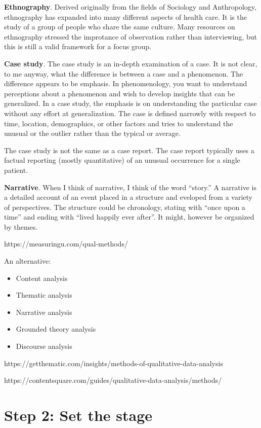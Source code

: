 \documentclass[
  letterpaper,
  DIV=11,
  numbers=noendperiod]{scrreprt}
\providecommand{\tightlist}{%
  \setlength{\itemsep}{0pt}\setlength{\parskip}{0pt}}
\begin{document}
\begin{tcolorbox}
\textbf{Ethnography}. Derived originally from the fields of Sociology
and Anthropology, ethnography has expanded into many different aspects
of health care. It is the study of a group of people who share the same
culture. Many resources on ethnography stressed the improtance of
observation rather than interviewing, but this is still a valid
framework for a focus group.

\textbf{Case study}. The case study is an in-depth examination of a
case. It is not clear, to me anyway, what the difference is between a
case and a phenomenon. The difference appears to be emphasis. In
phenomenology, you want to understand perceptions about a phenomenon and
wish to develop insights that can be generalized. In a case study, the
emphasis is on understanding the particular case without any effort at
generalization. The case is defined narrowly with respect to time,
location, demographics, or other factors and tries to understand the
unusual or the outlier rather than the typical or average.

The case study is not the same as a case report. The case report
typically uses a factual reporting (mostly quantitative) of an unusual
occurrence for a single patient.

\textbf{Narrative}. When I think of narrative, I think of the word
``story.'' A narrative is a detailed account of an event placed in a
structure and eveloped from a variety of perspectives. The structure
could be chronology, stating with ``once upon a time'' and ending with
``lived happily ever after''. It might, however be organized by themes.

https://measuringu.com/qual-methods/

An alternative:

\begin{itemize}
\tightlist
\item
  Content analysis
\item
  Thematic analysis
\item
  Narrative analysis
\item
  Grounded theory analysis
\item
  Discourse analysis
\end{itemize}

https://getthematic.com/insights/methods-of-qualitative-data-analysis

https://contentsquare.com/guides/qualitative-data-analysis/methods/

\section{Step 2: Set the stage}\label{step-2-set-the-stage}


\end{tcolorbox}
\end{document}
